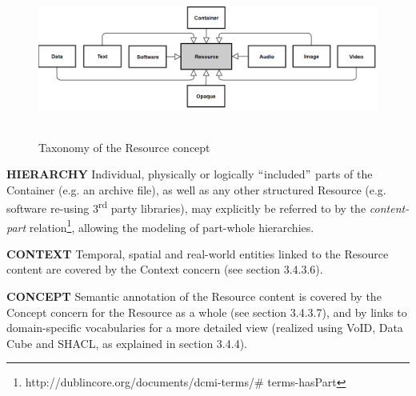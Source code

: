 
\begin{figure}[H]
	\begin{Center}
		\includegraphics[width=6.53in,height=2.02in]{./media/image34.png}
		\caption{Taxonomy of the Resource concept}
		\label{fig:Taxonomy_of_the_Resource_concept}
	\end{Center}
\end{figure}





\textbf{HIERARCHY} Individual, physically or logically $``$included$"$  parts of the Container (e.g. an archive file), as well as any other structured Resource (e.g. software re-using 3\textsuperscript{rd} party libraries), may explicitly be referred to by the \textit{content-part} relation\footnote{http://dublincore.org/documents/dcmi-terms/$\#$ terms-hasPart }, allowing the modeling of part-whole hierarchies.

\textbf{CONTEXT} Temporal, spatial and real-world entities linked to the Resource content are covered by the Context concern (see section 3.4.3.6).

\textbf{CONCEPT} Semantic annotation of the Resource content is covered by the Concept concern for the Resource as a whole (see section 3.4.3.7),
and by links to domain-specific vocabularies for a more detailed view (realized using VoID, Data Cube and SHACL, as explained in section 3.4.4).




